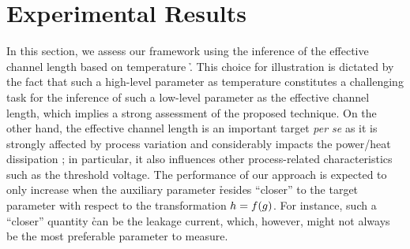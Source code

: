\section{Experimental Results}

In this section, we assess our framework using the inference of the effective
channel length \g based on temperature \h. This choice for illustration is
dictated by the fact that such a high-level parameter as temperature constitutes
a challenging task for the inference of such a low-level parameter as the
effective channel length, which implies a strong assessment of the proposed
technique. On the other hand, the effective channel length is an important
target \emph{per se} as it is strongly affected by process variation and
considerably impacts the power/heat dissipation \cite{chandrakasan2000,
srivastava2010, juan2012}; in particular, it also influences other
process-related characteristics such as the threshold voltage. The performance
of our approach is expected to only increase when the auxiliary parameter \h
resides ``closer'' to the target parameter \g with respect to the transformation
$h = f(g)$. For instance, such a ``closer'' quantity \h can be the leakage
current, which, however, might not always be the most preferable parameter to
measure.

